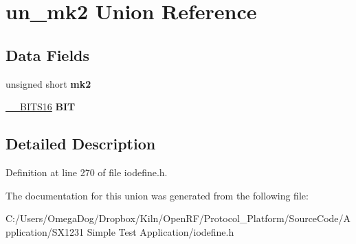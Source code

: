 \hypertarget{unionun__mk2}{\section{un\-\_\-mk2 Union Reference}
\label{unionun__mk2}
}
\subsection*{Data Fields}
\begin{DoxyCompactItemize}
\item 
\hypertarget{unionun__mk2_a3c0420cd747cece53650487268f2c5b6}{unsigned short {\bfseries mk2}}\label{unionun__mk2_a3c0420cd747cece53650487268f2c5b6}

\item 
\hypertarget{unionun__mk2_ab7c9497f63253f91f643803fa3b07b6f}{\hyperlink{struct_____b_i_t_s16}{\-\_\-\-\_\-\-B\-I\-T\-S16} {\bfseries B\-I\-T}}\label{unionun__mk2_ab7c9497f63253f91f643803fa3b07b6f}

\end{DoxyCompactItemize}


\subsection{Detailed Description}


Definition at line 270 of file iodefine.\-h.



The documentation for this union was generated from the following file\-:\begin{DoxyCompactItemize}
\item 
C\-:/\-Users/\-Omega\-Dog/\-Dropbox/\-Kiln/\-Open\-R\-F/\-Protocol\-\_\-\-Platform/\-Source\-Code/\-Application/\-S\-X1231 Simple Test Application/iodefine.\-h\end{DoxyCompactItemize}
